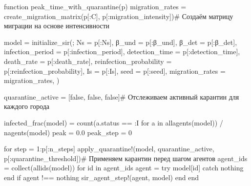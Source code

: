\documentclass[
  12pt,
  a4paper,
  DIV=11,
  numbers=noendperiod]{scrreprt}
\newenvironment{Shaded}{\begin{snugshade}}{\end{snugshade}}
\newcommand{\CommentTok}[1]{\textcolor[rgb]{0.37,0.37,0.37}{#1}}
\newcommand{\ConstantTok}[1]{\textcolor[rgb]{0.56,0.35,0.01}{#1}}
\newcommand{\ControlFlowTok}[1]{\textcolor[rgb]{0.00,0.23,0.31}{#1}}
\newcommand{\FloatTok}[1]{\textcolor[rgb]{0.68,0.00,0.00}{#1}}
\newcommand{\FunctionTok}[1]{\textcolor[rgb]{0.28,0.35,0.67}{#1}}
\newcommand{\KeywordTok}[1]{\textcolor[rgb]{0.00,0.23,0.31}{#1}}
\newcommand{\NormalTok}[1]{\textcolor[rgb]{0.00,0.23,0.31}{#1}}
\newcommand{\OperatorTok}[1]{\textcolor[rgb]{0.37,0.37,0.37}{#1}}
\begin{document}
\begin{Shaded}
\begin{Highlighting}[]
\KeywordTok{function} \FunctionTok{peak\_time\_with\_quarantine}\NormalTok{(p)}
\NormalTok{    migration\_rates }\OperatorTok{=} \FunctionTok{create\_migration\_matrix}\NormalTok{(p[}\OperatorTok{:}\NormalTok{C], p[}\OperatorTok{:}\NormalTok{migration\_intensity])}\CommentTok{\# Создаём матрицу миграции на основе интенсивности}

\NormalTok{    model }\OperatorTok{=} \FunctionTok{initialize\_sir}\NormalTok{(;}
\NormalTok{        Ns }\OperatorTok{=}\NormalTok{ p[}\OperatorTok{:}\NormalTok{Ns],}
\NormalTok{        β\_und }\OperatorTok{=}\NormalTok{ p[}\OperatorTok{:}\NormalTok{β\_und],}
\NormalTok{        β\_det }\OperatorTok{=}\NormalTok{ p[}\OperatorTok{:}\NormalTok{β\_det],}
\NormalTok{        infection\_period }\OperatorTok{=}\NormalTok{ p[}\OperatorTok{:}\NormalTok{infection\_period],}
\NormalTok{        detection\_time }\OperatorTok{=}\NormalTok{ p[}\OperatorTok{:}\NormalTok{detection\_time],}
\NormalTok{        death\_rate }\OperatorTok{=}\NormalTok{ p[}\OperatorTok{:}\NormalTok{death\_rate],}
\NormalTok{        reinfection\_probability }\OperatorTok{=}\NormalTok{ p[}\OperatorTok{:}\NormalTok{reinfection\_probability],}
\NormalTok{        Is }\OperatorTok{=}\NormalTok{ p[}\OperatorTok{:}\NormalTok{Is],}
\NormalTok{        seed }\OperatorTok{=}\NormalTok{ p[}\OperatorTok{:}\NormalTok{seed],}
\NormalTok{        migration\_rates }\OperatorTok{=}\NormalTok{ migration\_rates,}
\NormalTok{    )}

\NormalTok{    quarantine\_active }\OperatorTok{=}\NormalTok{ [}\ConstantTok{false}\NormalTok{, }\ConstantTok{false}\NormalTok{, }\ConstantTok{false}\NormalTok{]}\CommentTok{\# Отслеживаем активный карантин для каждого города}

    \FunctionTok{infected\_frac}\NormalTok{(model) }\OperatorTok{=} \FunctionTok{count}\NormalTok{(a.status }\OperatorTok{==} \OperatorTok{:}\NormalTok{I }\ControlFlowTok{for}\NormalTok{ a }\KeywordTok{in} \FunctionTok{allagents}\NormalTok{(model)) }\OperatorTok{/} \FunctionTok{nagents}\NormalTok{(model)}
\NormalTok{    peak }\OperatorTok{=} \FloatTok{0.0}
\NormalTok{    peak\_step }\OperatorTok{=} \FloatTok{0}

    \ControlFlowTok{for}\NormalTok{ step }\OperatorTok{=} \FloatTok{1}\OperatorTok{:}\NormalTok{p[}\OperatorTok{:}\NormalTok{n\_steps]}
        \FunctionTok{apply\_quarantine!}\NormalTok{(model, quarantine\_active, p[}\OperatorTok{:}\NormalTok{quarantine\_threshold])}\CommentTok{\# Применяем карантин перед шагом агентов}
\NormalTok{        agent\_ids }\OperatorTok{=} \FunctionTok{collect}\NormalTok{(}\FunctionTok{allids}\NormalTok{(model))}
        \ControlFlowTok{for}\NormalTok{ id }\KeywordTok{in}\NormalTok{ agent\_ids}
\NormalTok{            agent }\OperatorTok{=} \ControlFlowTok{try}
\NormalTok{                model[id]}
            \ControlFlowTok{catch}
                \ConstantTok{nothing}
            \ControlFlowTok{end}
            \ControlFlowTok{if}\NormalTok{ agent }\OperatorTok{!==} \ConstantTok{nothing}
                \FunctionTok{sir\_agent\_step!}\NormalTok{(agent, model)}
            \ControlFlowTok{end}
        \ControlFlowTok{end}


\end{Highlighting}
\end{Shaded}
\end{document}
